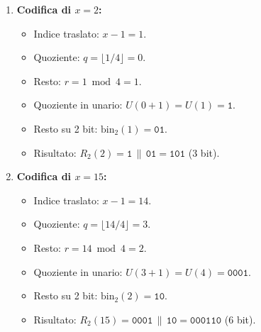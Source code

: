\begin{enumerate}
  \item \textbf{Codifica di $x = 2$:}
  \begin{itemize}
    \item Indice traslato: $x - 1 = 1$.
    \item Quoziente: $q = \lfloor 1 / 4 \rfloor = 0$.
    \item Resto: $r = 1 \bmod 4 = 1$.
    \item Quoziente in unario: $U(0 + 1) = U(1) = \texttt{1}$.
    \item Resto su 2 bit: $\text{bin}_2(1) = \texttt{01}$.
    \item Risultato: $R_2(2) = \texttt{1} \,\|\, \texttt{01} = \texttt{101}$ (3 bit).
  \end{itemize}

  \item \textbf{Codifica di $x = 15$:}
  \begin{itemize}
    \item Indice traslato: $x - 1 = 14$.
    \item Quoziente: $q = \lfloor 14 / 4 \rfloor = 3$.
    \item Resto: $r = 14 \bmod 4 = 2$.
    \item Quoziente in unario: $U(3 + 1) = U(4) = \texttt{0001}$.
    \item Resto su 2 bit: $\text{bin}_2(2) = \texttt{10}$.
    \item Risultato: $R_2(15) = \texttt{0001} \,\|\, \texttt{10} = \texttt{000110}$ (6 bit).
  \end{itemize}
\end{enumerate}

\begin{table}[H]
\centering
\small
\caption{Riepilogo delle codifiche di Rice per $k = 2$.}
\label{tab:riepilogo-rice-k2}
\end{table}
